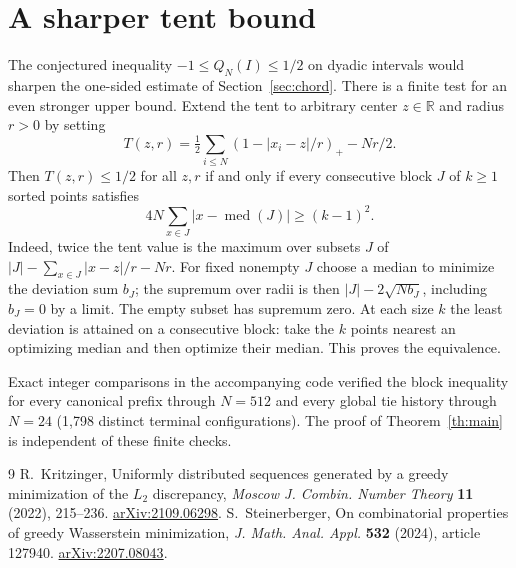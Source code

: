 \documentclass[11pt,a4paper]{amsart}
\begin{document}
\section{A sharper tent bound}
The conjectured inequality $-1\le Q_N(I)\le1/2$ on dyadic intervals
would sharpen the one-sided estimate of Section~\ref{sec:chord}.
There is a finite test for an even stronger upper bound. Extend the tent
to arbitrary center $z\in\mathbb R$ and radius $r>0$ by setting
\[
 T(z,r)=\tfrac12\sum_{i\le N}(1-|x_i-z|/r)_+-Nr/2 .
\]
Then $T(z,r)\le1/2$ for all $z,r$ if and only if every consecutive
block $J$ of $k\ge1$ sorted points satisfies
\[
 4N\sum_{x\in J}|x-\operatorname{med}(J)|\ge(k-1)^2 .
\]
Indeed, twice the tent value is the maximum over subsets $J$ of
$|J|-\sum_{x\in J}|x-z|/r-Nr$. For fixed nonempty $J$ choose a median
to minimize the deviation sum $b_J$; the supremum over radii is then
$|J|-2\sqrt{Nb_J}$, including $b_J=0$ by a limit. The empty subset
has supremum zero. At each size $k$ the least deviation is attained on
a consecutive block: take the $k$ points nearest an optimizing median
and then optimize their median. This proves the equivalence.

Exact integer comparisons in the accompanying code verified the block
inequality for every canonical prefix through $N=512$ and every global
tie history through $N=24$ (1,798 distinct terminal configurations).
The proof of Theorem~\ref{th:main} is independent of these finite checks.

\begin{thebibliography}{9}
 R.~Kritzinger, Uniformly distributed sequences generated by a
greedy minimization of the $L_2$ discrepancy, \emph{Moscow J. Combin.
Number Theory} \textbf{11} (2022), 215--236.
\href{https://arxiv.org/abs/2109.06298}{arXiv:2109.06298}.
 S.~Steinerberger, On combinatorial properties of greedy
Wasserstein minimization, \emph{J. Math. Anal. Appl.} \textbf{532}
(2024), article 127940.
\href{https://arxiv.org/abs/2207.08043}{arXiv:2207.08043}.
\end{thebibliography}
\end{document}
